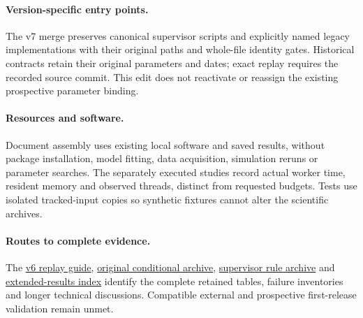 \documentclass[11pt,a4paper]{article}
\begin{document}
\paragraph{Version-specific entry points.}
The v7 merge preserves canonical supervisor scripts and explicitly named legacy
implementations with their original paths and whole-file identity gates.
Historical contracts retain their original parameters and dates; exact replay
requires the recorded source commit. This edit does not reactivate or reassign
the existing prospective parameter binding.

\paragraph{Resources and software.}
Document assembly uses existing local software and saved results, without
package installation, model fitting, data acquisition, simulation reruns or
parameter searches. The separately executed studies record actual worker time,
resident memory and observed threads, distinct from requested budgets. Tests
use isolated tracked-input copies so synthetic fixtures cannot alter the
scientific archives.

\paragraph{Routes to complete evidence.}
The \href{https://github.com/ByronLi0207/financial-mathematics-paper-20261020/blob/revision-v7-final/protocol/revision-v6/REPLAY.md}{v6 replay guide},
\href{https://github.com/ByronLi0207/financial-mathematics-paper-20261020/blob/revision-v7-final/results/revision-20261022/README.md}{original conditional archive},
\href{https://github.com/ByronLi0207/financial-mathematics-paper-20261020/blob/revision-v7-final/results/supervisor-20261023/r6/README.md}{supervisor rule archive} and
\href{https://github.com/ByronLi0207/financial-mathematics-paper-20261020/blob/revision-v7-final/EXTENDED_RESULTS.md}{extended-results index} identify the
complete retained tables, failure inventories and longer technical discussions.
Compatible external and prospective first-release validation remain unmet.
\end{document}
